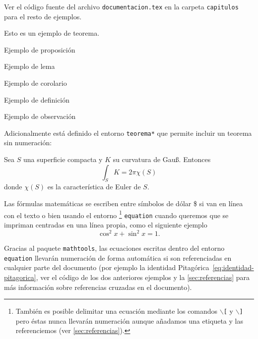 Ver el código fuente del archivo \texttt{documentacion.tex} en la carpeta \texttt{capitulos} para el resto de ejemplos.

\begin{teorema}\label{thm:teorema}
Esto es un ejemplo de teorema.
\end{teorema}

\begin{proposicion}
Ejemplo de proposición
\end{proposicion}

\begin{lema}
Ejemplo de lema
\end{lema}

\begin{corolario}
Ejemplo de corolario
\end{corolario}

\begin{definicion}
Ejemplo de definición
\end{definicion}

\begin{observacion}
Ejemplo de observación
\end{observacion}

Adicionalmente está definido el entorno \texttt{teorema*} que permite incluir un teorema sin numeración:

\begin{teorema*}
  Sea $S$ una superficie compacta y $K$ su curvatura de Gauß. Entonces
\begin{equation}
  \int_S K = 2\pi\chi(S)
\end{equation}
donde $\chi(S)$ es la característica de Euler de $S$.
\end{teorema*}

Las fórmulas matemáticas se escriben entre símbolos de dólar \$ si van en línea con el texto o bien usando el entorno%
\footnote{
  También es posible delimitar una ecuación mediante los comandos \texttt{$\backslash$[} y \texttt{$\backslash$]} pero éstas nunca llevarán numeración aunque añadamos una etiqueta y las referenciemos (ver \autoref{sec:referencias}).
} 
\texttt{equation} cuando queremos que se impriman centradas en una línea propia, como el siguiente ejemplo
\begin{equation}\label{eq:identidad-pitagorica}
  \cos^2 x + \sin^2 x = 1.
\end{equation}


Gracias al paquete \texttt{mathtools}, las ecuaciones escritas dentro del entorno \texttt{equation} llevarán numeración de forma automática si son referenciadas  en cualquier parte del documento (por ejemplo la identidad Pitagórica~\eqref{eq:identidad-pitagorica}, ver el código de los dos anteriores ejemplos y la \autoref{sec:referencias} para más información sobre referencias cruzadas en el documento).

